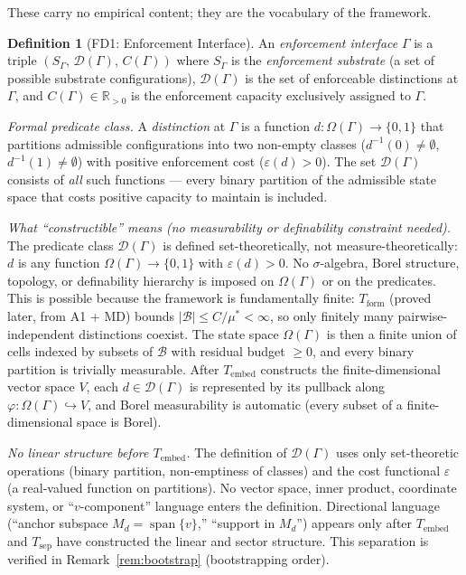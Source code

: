 \documentclass[11pt,a4paper]{article}
\theoremstyle{definition}
\newtheorem{definition}[theorem]{Definition}
\newcommand{\eps}{\varepsilon}
\DeclareMathOperator{\spn}{span}
\begin{document}
These carry no empirical content; they are the vocabulary of the framework.

\begin{definition}[FD1: Enforcement Interface]\label{def:FD1}
An \emph{enforcement interface} $\Gamma$ is a triple $(S_\Gamma,\, \mathcal{D}(\Gamma),\, C(\Gamma))$ where $S_\Gamma$ is the \emph{enforcement substrate} (a set of possible substrate configurations), $\mathcal{D}(\Gamma)$ is the set of enforceable distinctions at $\Gamma$, and $C(\Gamma) \in \mathbb{R}_{>0}$ is the enforcement capacity exclusively assigned to $\Gamma$.

\smallskip\noindent\textit{Formal predicate class.}  A \emph{distinction} at $\Gamma$ is a function $d: \Omega(\Gamma) \to \{0, 1\}$ that partitions admissible configurations into two non-empty classes ($d^{-1}(0) \ne \emptyset$, $d^{-1}(1) \ne \emptyset$) with positive enforcement cost ($\eps(d) > 0$).  The set $\mathcal{D}(\Gamma)$ consists of \emph{all} such functions --- every binary partition of the admissible state space that costs positive capacity to maintain is included.

\smallskip\noindent\textit{What ``constructible'' means (no measurability or definability constraint needed).}  The predicate class $\mathcal{D}(\Gamma)$ is defined set-theoretically, not measure-theoretically: $d$ is any function $\Omega(\Gamma) \to \{0,1\}$ with $\eps(d) > 0$.  No $\sigma$-algebra, Borel structure, topology, or definability hierarchy is imposed on $\Omega(\Gamma)$ or on the predicates.  This is possible because the framework is fundamentally finite: $T_{\mathrm{form}}$ (proved later, from A1 + MD) bounds $|\mathcal{B}| \le C/\mu^* < \infty$, so only finitely many pairwise-independent distinctions coexist.  The state space $\Omega(\Gamma)$ is then a finite union of cells indexed by subsets of $\mathcal{B}$ with residual budget $\ge 0$, and every binary partition is trivially measurable.  After $T_{\mathrm{embed}}$ constructs the finite-dimensional vector space $V$, each $d \in \mathcal{D}(\Gamma)$ is represented by its pullback along $\varphi: \Omega(\Gamma) \hookrightarrow V$, and Borel measurability is automatic (every subset of a finite-dimensional space is Borel).

\smallskip\noindent\textit{No linear structure before $T_{\mathrm{embed}}$.}  The definition of $\mathcal{D}(\Gamma)$ uses only set-theoretic operations (binary partition, non-emptiness of classes) and the cost functional $\eps$ (a real-valued function on partitions).  No vector space, inner product, coordinate system, or ``$v$-component'' language enters the definition.  Directional language (``anchor subspace $M_d = \spn\{v\}$,'' ``support in $M_d$'') appears only after $T_{\mathrm{embed}}$ and $T_{\mathrm{sep}}$ have constructed the linear and sector structure.  This separation is verified in Remark~\ref{rem:bootstrap} (bootstrapping order).


\end{definition}
\end{document}
